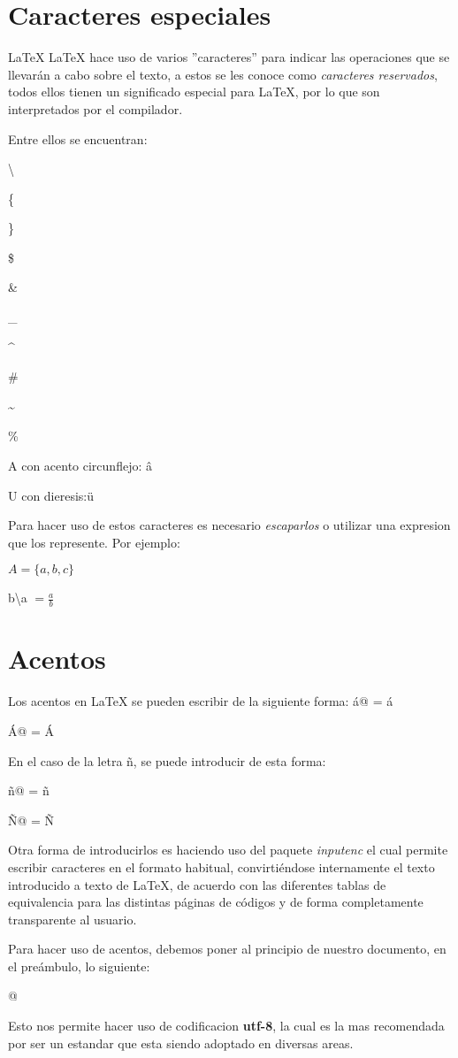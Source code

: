\documentclass[letterpaper,12pt]{article}
\begin{document}
\newpage
\section{Caracteres especiales}
\LaTeX %
LaTeX hace uso de varios ''caracteres'' para indicar las operaciones que se llevarán a cabo sobre el texto, 
a estos se les conoce como \emph{caracteres reservados}, todos ellos tienen un significado especial 
para LaTeX, por lo que son interpretados por el compilador.

Entre ellos se encuentran:

\textbackslash

\{

\}

\$

\&

\_

\^{}

\#

\~{}

\%

A con acento circunflejo: \^a 

U con dieresis:\"u

Para hacer uso de estos caracteres es necesario \textit{escaparlos} o utilizar una expresion que los represente. Por ejemplo:

$A = \{a, b, c\}$

b\textbackslash a $= \frac{a}{b}$

\section{Acentos}

Los acentos en LaTeX se pueden escribir de la siguiente forma:
\verb@\'a@ = \'a

\verb@\'A@ = \'A

En el caso de la letra \~n, se puede introducir de esta forma:

\verb@\~n@ = \~n

\verb@\~N@ = \~N

\noindent Otra forma de introducirlos es haciendo uso del paquete \textit{inputenc} el cual 
permite escribir caracteres en el formato habitual, convirtiéndose internamente el texto 
introducido a texto de LaTeX, de acuerdo con las diferentes tablas de equivalencia para las 
distintas páginas de códigos y de forma completamente transparente al usuario.

\noindent Para hacer uso de acentos, debemos poner al principio de nuestro documento, 
en el preámbulo, lo siguiente:

\verb@\usepackage[utf8]{inputenc}@

Esto nos permite hacer uso de codificacion \textbf{utf-8}, la cual es la mas recomendada por ser un estandar que esta siendo adoptado en diversas areas.
\end{document}
